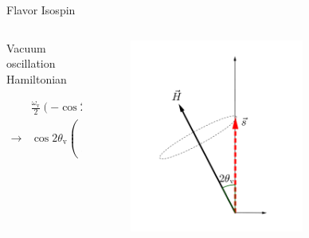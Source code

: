 \documentclass[9pt]{beamer}
\begin{document}
\begin{darkframes}
\begin{frame}{Flavor Isospin}
\begin{columns}[T]
\begin{column}{0.5\textwidth}
\end{column}
\end{columns}

\pause


\begin{columns}[T]
\begin{column}{0.5\textwidth}
\vspace{10pt}
Vacuum oscillation Hamiltonian

\begin{align*}
&\frac{\omega_{\mathrm v} }{2}\left( - \cos 2\theta_{\mathrm v } \boldsymbol{\sigma}_3  + \sin 2\theta_{\mathrm{v}} \boldsymbol{\sigma}_1\ \right)\\
\to & \cos 2\theta_{\mathrm v}\begin{pmatrix}
0\\
0\\
\omega_{\mathrm v}
\end{pmatrix} -\sin 2\theta_{\mathrm v}\begin{pmatrix}
\omega_{\mathrm v}\\
0\\
0
\end{pmatrix}
\end{align*}



\end{column}%
\begin{column}{0.5\textwidth}

\begin{tcolorbox}
\begin{figure}
    \centering
    \includegraphics[width=0.7\textwidth]{assets/flavor-isospin-1}
\end{figure}
\end{tcolorbox}




\end{column}
\end{columns}
\end{frame}
\end{darkframes}
\end{document}
